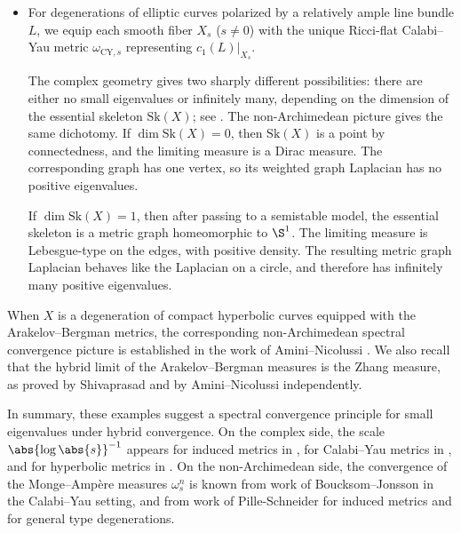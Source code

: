 \documentclass[12pt]{amsart}
\begin{document}
\begin{itemize}
    \item
    For degenerations of elliptic curves polarized by a relatively
    ample line bundle $L$, we equip each smooth fiber $X_s$ ($s\neq 0$)
    with the unique Ricci-flat Calabi--Yau metric
    $\omega_{\mathrm{CY},s}$ representing $c_1(L)|_{X_s}$.

    The complex geometry gives two sharply different possibilities:
    there are either no small eigenvalues or infinitely many, depending
    on the dimension of the essential skeleton $\mathrm{Sk}(X)$; see
    . The non-Archimedean picture gives the
    same dichotomy. If $\dim \mathrm{Sk}(X)=0$, then
    $\mathrm{Sk}(X)$ is a point by connectedness, and the limiting
    measure is a Dirac measure. The corresponding graph has one vertex,
    so its weighted graph Laplacian has no positive eigenvalues.

    If $\dim \mathrm{Sk}(X)=1$, then after passing to a semistable
    model, the essential skeleton is a metric graph homeomorphic to
    $\S^1$. The limiting measure is Lebesgue-type on the edges, with
    positive density. The resulting metric graph Laplacian behaves like
    the Laplacian on a circle, and therefore has infinitely many
    positive eigenvalues.
\end{itemize}

\begin{remark}
    When \(X\) is a degeneration of compact hyperbolic curves equipped
    with the Arakelov--Bergman metrics, the corresponding
    non-Archimedean spectral convergence picture is established in the
    work of Amini--Nicolussi \cite{Amini-Nicolussi2022}. We also recall
    that the hybrid limit of the Arakelov--Bergman measures
    is the Zhang measure, as proved by Shivaprasad
    \cite{Shivaprasad2024} and by Amini--Nicolussi 
    \cite{Amini-Nicolussi2025AENS} independently.
\end{remark}

In summary, these examples suggest a spectral convergence principle for
{small eigenvalues} under hybrid convergence. On the complex side,
the scale \(\abs{\log\abs{s}}^{-1}\) appears for induced metrics in
, for Calabi--Yau metrics in
, and for hyperbolic metrics in
. On the non-Archimedean side, the
convergence of the Monge--Amp\`ere measures \(\omega_s^n\) is known from
work of Boucksom--Jonsson in the Calabi--Yau setting, and from work of
Pille-Schneider for induced metrics and for general type degenerations.
\end{document}
